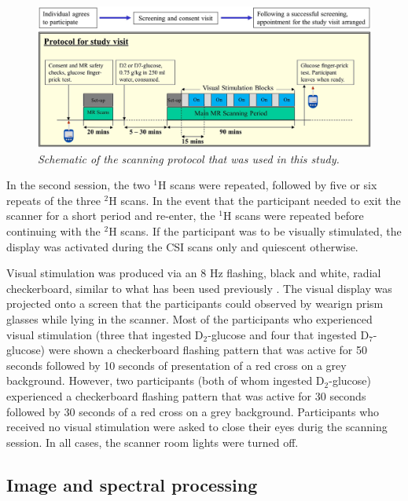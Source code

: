 \begin{figure}
    \centering
    \includegraphics[width = 1\textwidth]{Figures/Glucose/Protocol.png}
    \caption{\textit{Schematic of the scanning protocol that was used in this study.}}
    \label{fig:Glu:Protocol}
\end{figure}

In the second session, the two $^1$H scans were repeated, followed by five or six repeats of the three $^2$H scans. In the event that the participant needed to exit the scanner for a short period and re-enter, the $^1$H scans were repeated before continuing with the $^2$H scans. If the participant was to be visually stimulated, the display was activated during the \ac{CSI} scans only and quiescent otherwise.  

Visual stimulation was produced via an 8 Hz flashing, black and white, radial checkerboard, similar to what has been used previously \cite{Fernandes2020MeasurementT}. The visual display was projected onto a screen that the participants could observed by wearign prism glasses while lying in the scanner. Most of the participants who experienced visual stimulation (three that ingested D$_2$-glucose and four that ingested D$_7$-glucose) were shown a checkerboard flashing pattern that was active for 50 seconds followed by 10 seconds of presentation of a red cross on a grey background. However, two participants (both of whom ingested D$_2$-glucose) experienced a checkerboard flashing pattern that was active for 30 seconds followed by 30 seconds of a red cross on a grey background. Participants who received no visual stimulation were asked to close their eyes durig the scanning session. In all cases, the scanner room lights were turned off. 

\subsection{Image and spectral processing}

